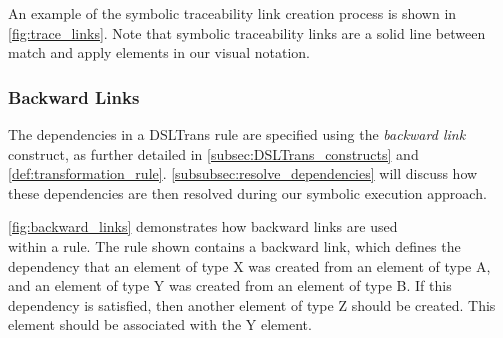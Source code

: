 An example of the symbolic traceability link creation process is shown in
\cref{fig:trace_links}. Note that symbolic traceability links are a solid line between
match and apply elements in our visual notation.



\subsubsection{Backward Links}
\label{subsubsec:backward_links}

The dependencies in a DSLTrans rule are specified using the \textit{backward link} construct, as further detailed in \cref{subsec:DSLTrans_constructs} and \cref{def:transformation_rule}. \cref{subsubsec:resolve_dependencies} will discuss how these dependencies are then resolved during our symbolic execution approach.

\cref{fig:backward_links} demonstrates how backward links are used \\within a rule. The rule shown contains a backward link, which defines the dependency that an element of type X was created from an element of type A, and an element of type Y was created from an element of type B. If this dependency is satisfied, then another element of type Z should be created. This element should be associated with the Y element.

